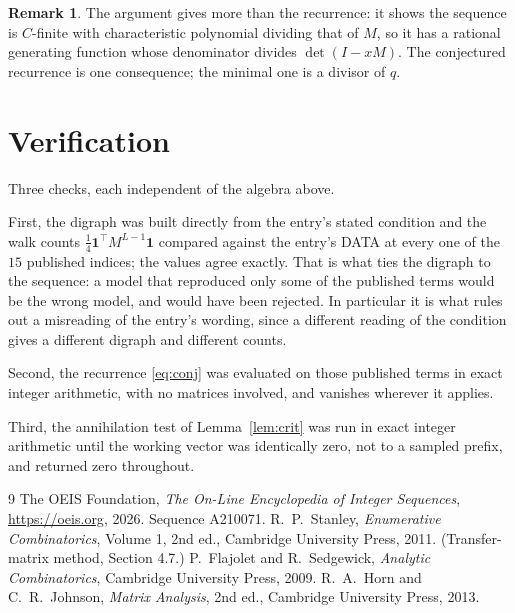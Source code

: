 \documentclass[11pt,a4paper]{article}
\theoremstyle{plain}
\theoremstyle{definition}
\newtheorem{remark}[theorem]{Remark}
\begin{document}
\begin{remark}
The argument gives more than the recurrence: it shows the sequence is $C$-finite with
characteristic polynomial dividing that of $M$, so it has a rational generating function
whose denominator divides $\det(I-xM)$. The conjectured recurrence is one consequence; the
minimal one is a divisor of $q$.
\end{remark}

\section{Verification}

Three checks, each independent of the algebra above.

First, the digraph was built directly from the entry's stated condition and the walk counts
$\tfrac1{4}\mathbf{1}^{\!\top}M^{L-1}\mathbf{1}$ compared against the entry's DATA at
every one of the $15$ published indices; the values agree exactly. That is what ties
the digraph to the sequence: a model that reproduced only some of the published terms would
be the wrong model, and would have been rejected. In particular it is what rules out a
misreading of the entry's wording, since a different reading of the condition gives a
different digraph and different counts.

Second, the recurrence \eqref{eq:conj} was evaluated on those published terms in exact
integer arithmetic, with no matrices involved, and vanishes wherever it applies.

Third, the annihilation test of Lemma~\ref{lem:crit} was run in exact integer arithmetic
until the working vector was identically zero, not to a sampled prefix, and returned zero
throughout.

\begin{thebibliography}{9}
 The OEIS Foundation, \emph{The On-Line Encyclopedia of Integer
Sequences}, \url{https://oeis.org}, 2026. Sequence A210071.
 R.~P.~Stanley, \emph{Enumerative Combinatorics}, Volume 1, 2nd ed.,
Cambridge University Press, 2011. (Transfer-matrix method, Section 4.7.)
 P.~Flajolet and R.~Sedgewick, \emph{Analytic Combinatorics}, Cambridge
University Press, 2009.
 R.~A.~Horn and C.~R.~Johnson, \emph{Matrix Analysis}, 2nd ed., Cambridge
University Press, 2013.
\end{thebibliography}
\end{document}
